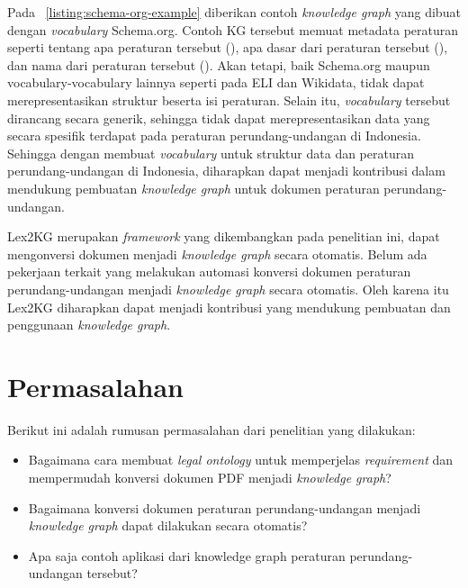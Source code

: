 Pada \lst~\ref{listing:schema-org-example} diberikan contoh \textit{knowledge graph} yang dibuat
dengan \textit{vocabulary} Schema.org. Contoh KG tersebut memuat metadata peraturan seperti tentang
apa peraturan tersebut (), apa dasar dari peraturan tersebut
(), dan nama dari peraturan tersebut (). Akan tetapi, baik
Schema.org maupun vocabulary-vocabulary lainnya seperti pada ELI dan Wikidata, tidak dapat
merepresentasikan struktur beserta isi peraturan. Selain itu, \textit{vocabulary} tersebut dirancang
secara generik, sehingga tidak dapat merepresentasikan data yang secara spesifik terdapat pada
peraturan perundang-undangan di Indonesia. Sehingga dengan membuat \textit{vocabulary} untuk
struktur data dan peraturan perundang-undangan di Indonesia, diharapkan dapat menjadi kontribusi
dalam mendukung pembuatan \textit{knowledge graph} untuk dokumen peraturan perundang-undangan.

Lex2KG merupakan \textit{framework} yang dikembangkan pada penelitian ini, dapat mengonversi dokumen
menjadi \textit{knowledge graph} secara otomatis. Belum ada pekerjaan terkait yang melakukan
automasi konversi dokumen peraturan perundang-undangan menjadi \textit{knowledge graph} secara
otomatis. Oleh karena itu Lex2KG diharapkan dapat menjadi kontribusi yang mendukung pembuatan dan
penggunaan \textit{knowledge graph}.

\section{Permasalahan}\label{sec:permasalahan}

Berikut ini adalah rumusan permasalahan dari penelitian yang dilakukan:
\begin{itemize}
  \itemsep1pt\parskip0pt
  \item Bagaimana cara membuat \textit{legal ontology} untuk memperjelas \textit{requirement} dan
        mempermudah konversi dokumen PDF menjadi \textit{knowledge graph}?
  \item Bagaimana konversi dokumen peraturan perundang-undangan menjadi \textit{knowledge graph} dapat
        dilakukan secara otomatis?
  \item Apa saja contoh aplikasi dari knowledge graph peraturan perundang-undangan tersebut?
\end{itemize}

